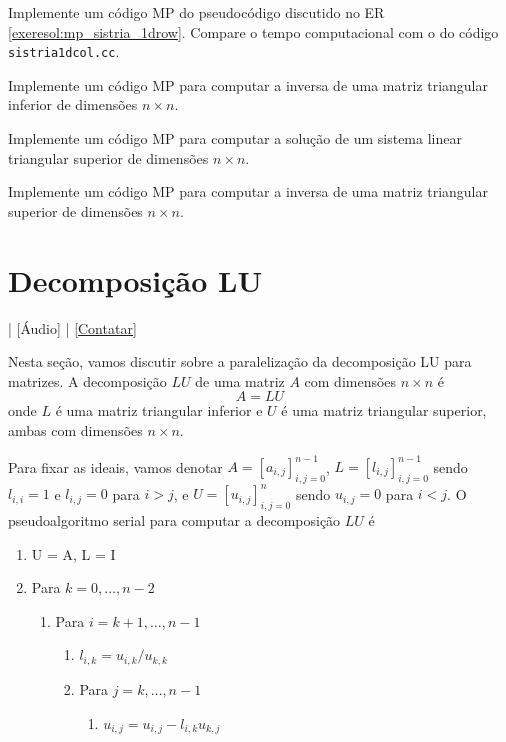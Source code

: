 \begin{exer}
  Implemente um código MP do pseudocódigo discutido no ER \ref{exeresol:mp_sistria_1drow}. Compare o tempo computacional com o do código \verb+sistria1dcol.cc+.
\end{exer}

\begin{exer}
  Implemente um código MP para computar a inversa de uma matriz triangular inferior de dimensões $n\times n$.
\end{exer}

\begin{exer}
  Implemente um código MP para computar a solução de um sistema linear triangular superior de dimensões $n\times n$.
\end{exer}

\begin{exer}
  Implemente um código MP para computar a inversa de uma matriz triangular superior de dimensões $n\times n$.
\end{exer}

\section{Decomposição LU}\label{cap_mp_sec_lu}

\begin{flushright}
  [Vídeo] | [Áudio] | \href{https://phkonzen.github.io/notas/contato.html}{[Contatar]}
\end{flushright}

Nesta seção, vamos discutir sobre a paralelização da decomposição LU para matrizes. A decomposição $LU$ de uma matriz $A$ com dimensões $n\times n$ é
\begin{equation}
  A = LU
\end{equation}
onde $L$ é uma matriz triangular inferior e $U$ é uma matriz triangular superior, ambas com dimensões $n\times n$.

Para fixar as ideais, vamos denotar $A = [a_{i,j}]_{i,j=0}^{n-1}$, $L = [l_{i,j}]_{i,j=0}^{n-1}$ sendo $l_{i,i}=1$ e $l_{i,j}=0$ para $i>j$, e $U = [u_{i,j}]_{i,j=0}^n$ sendo $u_{i,j}=0$ para $i<j$. O pseudoalgoritmo serial para computar a decomposição $LU$ é
\begin{enumerate}
\item U = A, L = I
\item Para $k = 0,\dotsc, n-2$
  \begin{enumerate}
  \item Para $i = k+1,\dotsc,n-1$
    \begin{enumerate}
    \item $l_{i,k} = u_{i,k}/u_{k,k}$
    \item Para $j = k,\dotsc, n-1$
      \begin{enumerate}
      \item $u_{i,j} = u_{i,j} - l_{i,k}u_{k,j}$
      \end{enumerate}
    \end{enumerate}
  \end{enumerate}
\end{enumerate}

